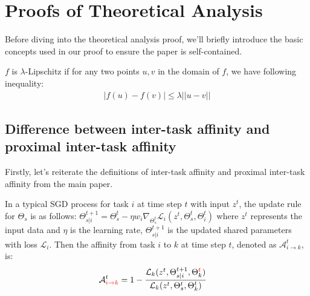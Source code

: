 \clearpage
\newpage
\appendix
\renewcommand{\thetable}{\thesection.\arabic{table}}
\renewcommand\thefigure{\thesection.\arabic{figure}}    

\section{Proofs of Theoretical Analysis}
\label{Append:proof}
Before diving into the theoretical analysis proof, we'll briefly introduce the basic concepts used in our proof to ensure the paper is self-contained.

\begin{definition} $f$ is $\lambda$-Lipschitz if for any two points $u,v$ in the domain of $f$, we have following inequality:
\begin{align}
    |f(u)-f(v)|\leq \lambda ||u-v||
\end{align}
\end{definition}
\subsection{Difference between inter-task affinity and proximal inter-task affinity}
\label{Append:differeence_affinity}
Firstly, let's reiterate the definitions of inter-task affinity and proximal inter-task affinity from the main paper.

In a typical SGD process for task $i$ at time step $t$ with input $z^t$, the update rule for $\Theta_s$ is as follows: $\Theta_{s|i}^{t+1} = \Theta_s^t-\eta w_i \nabla_{\Theta_s^t} \mathcal{L}_i(z^t, \Theta_s^t, \Theta_i^t)$ where $z^t$ represents the input data and $\eta$ is the learning rate, $\Theta_{s|i}^{t+1}$ is the updated shared parameters with loss $\mathcal{L}_i$. Then the affinity from task $i$ to $k$ at time step $t$, denoted as $\mathcal{A}^t_{i\rightarrow k}$, is:
\begin{align}
    \mathcal{A}^t_{\textcolor{red}{i\rightarrow k}} &= 1- \frac{\mathcal{L}_k(z^t, \Theta_{s|i}^{t+1}, \Theta_k^{\textcolor{red}{t}})}{\mathcal{L}_k(z^t, \Theta_{s}^{t}, \Theta_k^t)}
    \label{append:definition:inter_task_affinity}
\end{align}

